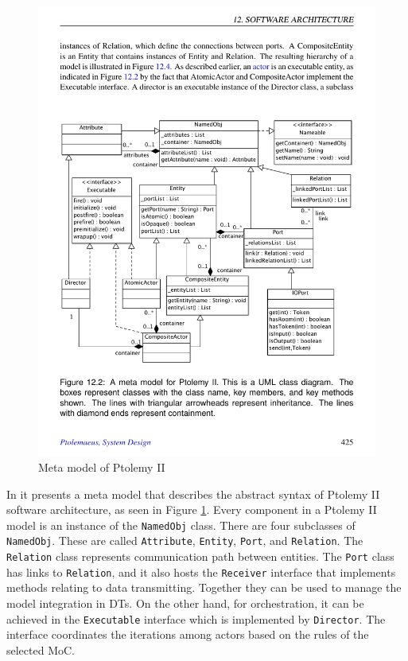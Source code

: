 \documentclass[journal,onecolumn]{IEEEtran} %
\begin{document}
\begin{figure}[hbt!]
  \centering
  \includegraphics[scale=0.8]{figures/pt2meta.pdf}
  \caption{Meta model of Ptolemy II}
  \label{fig:pt2meta}
\end{figure}

In \cite{Ptolemaeus2014} it presents a meta model that describes the abstract syntax of Ptolemy II software architecture, as seen in Figure \ref{fig:pt2meta}. Every component in a Ptolemy II model is an instance of the \texttt{NamedObj} class. There are four subclasses of \texttt{NamedObj}. These are called \texttt{Attribute}, \texttt{Entity}, \texttt{Port}, and \texttt{Relation}. The \texttt{Relation} class represents communication path between entities. The \texttt{Port} class has links to \texttt{Relation}, and it also hosts the \texttt{Receiver} interface that implements methods relating to data transmitting. Together they can be used to manage the model integration in DTs. On the other hand, for orchestration, it can be achieved in the \texttt{Executable} interface which is implemented by \texttt{Director}. The interface coordinates the iterations among actors based on the rules of the selected MoC.
\end{document}
